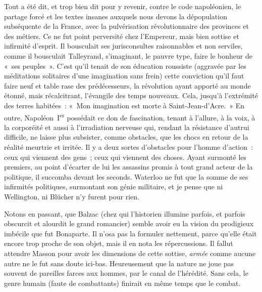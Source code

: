 \documentclass[french,twoside]{book} %
\begin{document}
Tout a été dit, et trop bien dit pour y revenir, contre le code napoléonien, le partage forcé et les textes insanes auxquels nous devons la dépopulation subséquente de la France, avec la pulvérisation révolutionnaire des provinces et des métiers. Ce ne fut point perversité chez l’Empereur, mais bien sottise et infirmité d’esprit. Il bousculait ses jurisconsultes raisonnables et non serviles, comme il bousculait Talleyrand, s’imaginant, le pauvre type, faire le bonheur de « ses peuples ». C’est qu’il tenait de son éducation roussiste (aggravée par les méditations solitaires d’une imagination sans frein) cette conviction qu’il faut faire neuf et table rase des prédécesseurs, la révolution ayant apporté au monde étonné, mais récalcitrant, l’évangile des temps nouveaux. Cela, jusqu’à l’extrémité des terres habitées : « Mon imagination est morte à Saint-Jean-d’Acre. » En outre, Napoléon I\textsuperscript{er} possédait ce don de fascination, tenant à l’allure, à la voix, à la corporéité et aussi à l’irradiation nerveuse qui, rendant la résistance d’autrui difficile, ne laisse plus subsister, comme obstacles, que les chocs en retour de la réalité meurtrie et irritée. Il y a deux sortes d’obstacles pour l’homme d’action : ceux qui viennent des gens ; ceux qui viennent des choses. Ayant surmonté les premiers, au point d’écarter de lui les assassins promis à tout grand acteur de la politique, il succomba devant les seconds. Waterloo ne fut que la somme de ses infirmités politiques, surmontant son génie militaire, et je pense que ni Wellington, ni Blücher n’y furent pour rien.\par
Notons en passant, que Balzac (chez qui l’historien illumine parfois, et parfois obscurcit et alourdit le grand romancier) semble avoir eu la vision du prodigieux imbécile que fut Bonaparte. Il n’osa pas la formuler nettement, parce qu’elle était encore trop proche de son objet, mais il en nota les répercussions. Il fallut attendre Masson pour avoir les dimensions de cette sottise, {\itshape armée} comme aucune autre ne le fut sans doute ici-bas. Heureusement que la nature ne joue pas souvent de pareilles farces aux hommes, par le canal de l’hérédité. Sans cela, le genre humain (faute de combattants) finirait en même temps que le combat.\par
\end{document}
